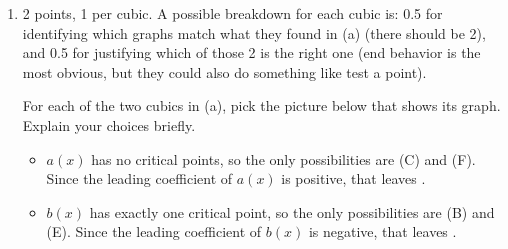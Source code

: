 \documentclass{article}
\begin{document}
\begin{enumerate}
\begin{enumerate}
\begin{enumerate}
      \begin{problem}[\nstretch{0.75}]
        $c(x) = x^3 + 7 x^{-1}$
      \end{problem}

      \begin{solution}
        This is not a cubic.
      \end{solution}

    \end{enumerate}

  \item

    \begin{grading}
      2 points, 1 per cubic. A possible breakdown for each cubic is: 0.5 for identifying which graphs match what they found in (a) (there should be 2), and 0.5 for justifying which of those 2 is the right one (end behavior is the most obvious, but they could also do something like test a point).
    \end{grading}

    \begin{problem}
      For each of the two cubics in (a), pick the picture below that shows its graph. Explain your choices briefly. 
    \end{problem}

    \begin{solution}
      \begin{itemize}
        \item $a(x)$ has no critical points, so the only possibilities
        are (C) and (F). Since the leading coefficient of $a(x)$ is
        positive, that leaves .
        \item $b(x)$ has exactly one critical point, so
        the only possibilities are (B) and (E). Since the leading
        coefficient of $b(x)$ is negative, that leaves .
      \end{itemize}
    \end{solution}


\end{enumerate}
\end{enumerate}
\end{document}
